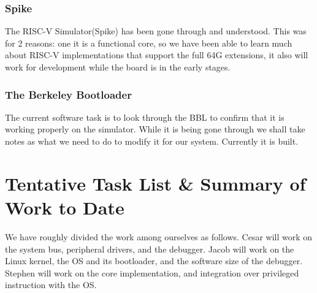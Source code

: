 \documentclass{article}
\begin{document}
    
    \subsubsection{Spike}
    The RISC-V Simulator(Spike) has been gone through and understood. This was for 2 reasons: one it is a functional core, so we have been able to learn much about RISC-V implementations that support the full 64G extensions, it also will work for development while the board is in the early stages.
    
    \subsubsection{The Berkeley Bootloader}
    The current software task is to look through the BBL to confirm that it is working properly on the simulator. While it is being gone through we shall take notes as what we need to do to modify it for our system. Currently it is built.


\section{Tentative Task List \& Summary of Work to Date}
We have roughly divided the work among ourselves as follows.  Cesar will work on the system bus, peripheral drivers, and the debugger.  Jacob will work on the Linux kernel, the OS and its bootloader, and the software size of the debugger.  Stephen will work on the core implementation, and integration over privileged instruction with the OS.
\end{document}
